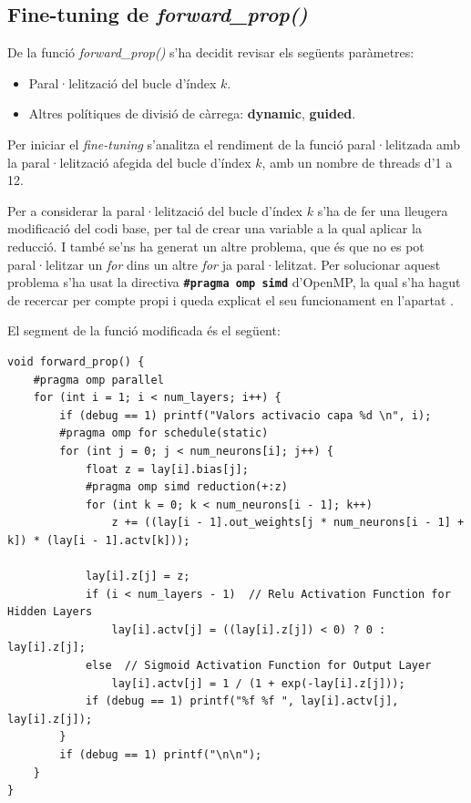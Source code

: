 \documentclass{article}
\begin{document}
\subsection{Fine-tuning de \textit{forward\_prop()}}

De la funció \textit{forward\_prop()} s'ha decidit revisar els següents paràmetres:

\begin{itemize}
    \item Paral·lelització del bucle d'índex $k$.
    \item Altres polítiques de divisió de càrrega: \textbf{dynamic}, \textbf{guided}.
\end{itemize}

Per iniciar el \textit{fine-tuning} s'analitza el rendiment de la funció paral·lelitzada amb la paral·lelització afegida del bucle d'índex $k$, amb un nombre de threads d'1 a 12.

Per a considerar la paral·lelització del bucle d'índex $k$ s'ha de fer una lleugera modificació del codi base, per tal de crear una variable a la qual aplicar la reducció. I també se'ns ha generat un altre problema, que és que no es pot paral·lelitzar un \textit{for} dins un altre \textit{for} ja paral·lelitzat. Per solucionar aquest problema s'ha usat la directiva \textbf{\texttt{\#pragma omp simd}} d'OpenMP, la qual s'ha hagut de recercar per compte propi i queda explicat el seu funcionament en l'apartat \texttt{}.

El segment de la funció modificada és el següent:
\begin{lstlisting}
void forward_prop() {
    #pragma omp parallel
    for (int i = 1; i < num_layers; i++) {
        if (debug == 1) printf("Valors activacio capa %d \n", i);
        #pragma omp for schedule(static)
        for (int j = 0; j < num_neurons[i]; j++) {
            float z = lay[i].bias[j];
            #pragma omp simd reduction(+:z)
            for (int k = 0; k < num_neurons[i - 1]; k++)
                z += ((lay[i - 1].out_weights[j * num_neurons[i - 1] + k]) * (lay[i - 1].actv[k]));

            lay[i].z[j] = z;
            if (i < num_layers - 1)  // Relu Activation Function for Hidden Layers
                lay[i].actv[j] = ((lay[i].z[j]) < 0) ? 0 : lay[i].z[j];
            else  // Sigmoid Activation Function for Output Layer
                lay[i].actv[j] = 1 / (1 + exp(-lay[i].z[j]));
            if (debug == 1) printf("%f %f ", lay[i].actv[j], lay[i].z[j]);
        }
        if (debug == 1) printf("\n\n");
    }
}
\end{lstlisting}
\end{document}
